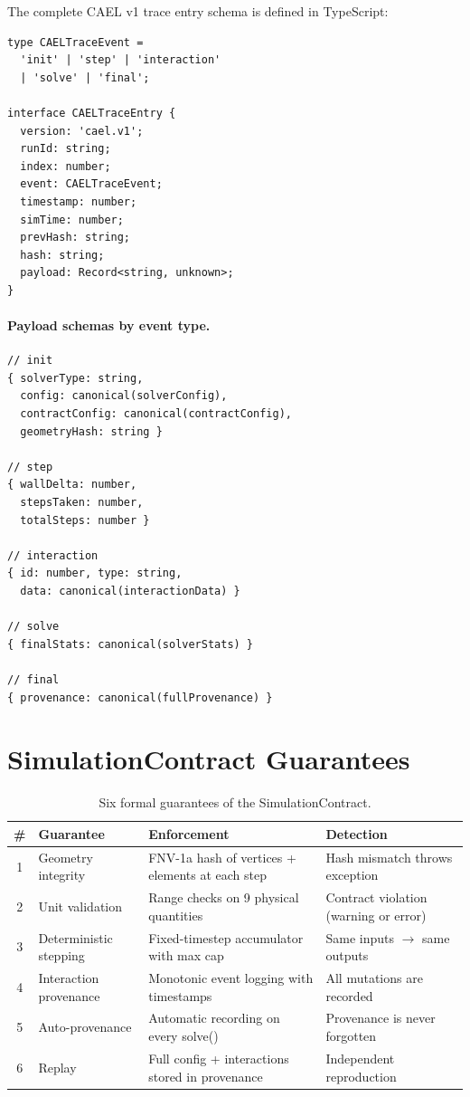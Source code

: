 \documentclass[letterpaper,twocolumn,10pt]{article}
\begin{document}
The complete CAEL v1 trace entry schema is defined in TypeScript:

\begin{lstlisting}[caption={Complete CAEL trace entry type.},
  label=lst:schema]
type CAELTraceEvent =
  'init' | 'step' | 'interaction'
  | 'solve' | 'final';

interface CAELTraceEntry {
  version: 'cael.v1';
  runId: string;
  index: number;
  event: CAELTraceEvent;
  timestamp: number;
  simTime: number;
  prevHash: string;
  hash: string;
  payload: Record<string, unknown>;
}
\end{lstlisting}

\paragraph{Payload schemas by event type.}

\begin{lstlisting}[caption={Event-specific payload schemas.},
  label=lst:payloads,language={}]
// init
{ solverType: string,
  config: canonical(solverConfig),
  contractConfig: canonical(contractConfig),
  geometryHash: string }

// step
{ wallDelta: number,
  stepsTaken: number,
  totalSteps: number }

// interaction
{ id: number, type: string,
  data: canonical(interactionData) }

// solve
{ finalStats: canonical(solverStats) }

// final
{ provenance: canonical(fullProvenance) }
\end{lstlisting}

\section{SimulationContract Guarantees}
\label{app:contract}

\begin{table}[t]
  \centering
  \caption{Six formal guarantees of the SimulationContract.}
  \label{tab:guarantees}
  \footnotesize
  \begin{tabular}{@{}clll@{}}
    \toprule
    \# & Guarantee & Enforcement & Detection \\
    \midrule
    1 & Geometry integrity & FNV-1a hash of vertices + elements at each step & Hash mismatch throws exception \\
    2 & Unit validation & Range checks on 9 physical quantities & Contract violation (warning or error) \\
    3 & Deterministic stepping & Fixed-timestep accumulator with max cap & Same inputs $\rightarrow$ same outputs \\
    4 & Interaction provenance & Monotonic event logging with timestamps & All mutations are recorded \\
    5 & Auto-provenance & Automatic recording on every solve() & Provenance is never forgotten \\
    6 & Replay & Full config + interactions stored in provenance & Independent reproduction \\
    \bottomrule
  \end{tabular}
\end{table}
\end{document}
